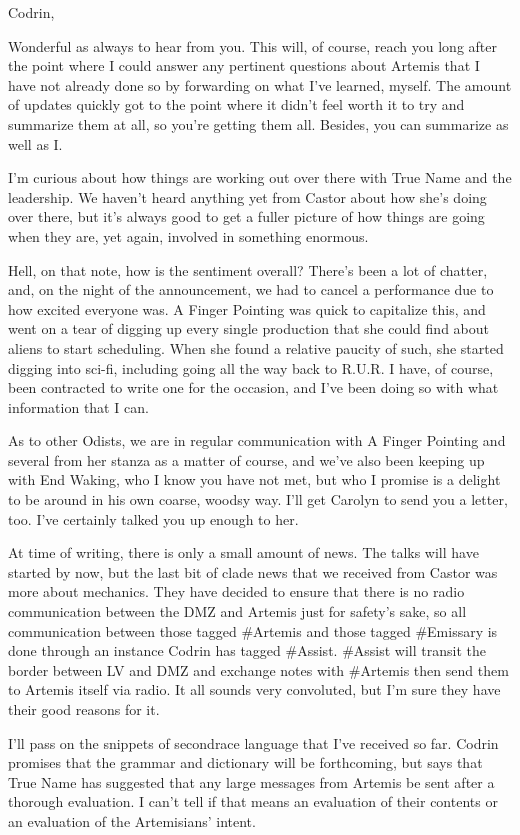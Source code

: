 Codrin,

Wonderful as always to hear from you. This will, of course, reach you long after the point where I could answer any pertinent questions about Artemis that I have not already done so by forwarding on what I've learned, myself. The amount of updates quickly got to the point where it didn't feel worth it to try and summarize them at all, so you're getting them all. Besides, you can summarize as well as I.

I'm curious about how things are working out over there with True Name and the leadership. We haven't heard anything yet from Castor about how she's doing over there, but it's always good to get a fuller picture of how things are going when they are, yet again, involved in something enormous.

Hell, on that note, how is the sentiment overall? There's been a lot of chatter, and, on the night of the announcement, we had to cancel a performance due to how excited everyone was. A Finger Pointing was quick to capitalize this, and went on a tear of digging up every single production that she could find about aliens to start scheduling. When she found a relative paucity of such, she started digging into sci-fi, including going all the way back to R.U.R. I have, of course, been contracted to write one for the occasion, and I've been doing so with what information that I can.

As to other Odists, we are in regular communication with A Finger Pointing and several from her stanza as a matter of course, and we've also been keeping up with End Waking, who I know you have not met, but who I promise is a delight to be around in his own coarse, woodsy way. I'll get Carolyn to send you a letter, too. I've certainly talked you up enough to her.

At time of writing, there is only a small amount of news. The talks will have started by now, but the last bit of clade news that we received from Castor was more about mechanics. They have decided to ensure that there is no radio communication between the DMZ and Artemis just for safety's sake, so all communication between those tagged \#Artemis and those tagged \#Emissary is done through an instance Codrin has tagged \#Assist. \#Assist will transit the border between LV and DMZ and exchange notes with \#Artemis then send them to Artemis itself via radio. It all sounds very convoluted, but I'm sure they have their good reasons for it.

I'll pass on the snippets of secondrace language that I've received so far. Codrin promises that the grammar and dictionary will be forthcoming, but says that True Name has suggested that any large messages from Artemis be sent after a thorough evaluation. I can't tell if that means an evaluation of their contents or an evaluation of the Artemisians' intent.

